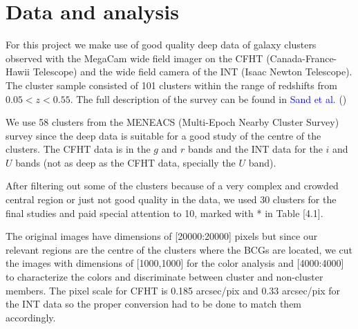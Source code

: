 \chapter{Data and analysis}

For this project we make use of good quality deep data of galaxy clusters observed with the MegaCam wide field imager on the CFHT (Canada-France-Hawii Telescope) and the wide field camera of the INT (Isaac Newton Telescope). The cluster sample consisted of 101 clusters within the range of redshifts from $0.05<z<0.55$. The full description of the survey can be found in \textcolor{blue}{Sand et al.} (\citeyear{Reference11})

We use 58 clusters from the MENEACS (Multi-Epoch Nearby Cluster Survey) survey since the deep data is suitable for a good study of the centre of the clusters. The CFHT data is in the $g$ and $r$ bands and the INT data for the $i$ and $U$ bands (not as deep as the CFHT data, specially the $U$ band). 

After filtering out some of the clusters because of a very complex and crowded central region or just not good quality in the data, we used 30 clusters for the final studies and paid special attention to 10, marked with * in Table [4.1].

The original images have dimensions of [20000:20000] pixels but since our relevant regions are the centre of the clusters where the BCGs are located, we cut the images with dimensions of [1000,1000] for the color analysis and [4000:4000] to characterize the colors and discriminate between cluster and non-cluster members. The pixel scale for CFHT is 0.185 arcsec/pix and 0.33 arcsec/pix for the INT data so the proper conversion had to be done to match them accordingly.

